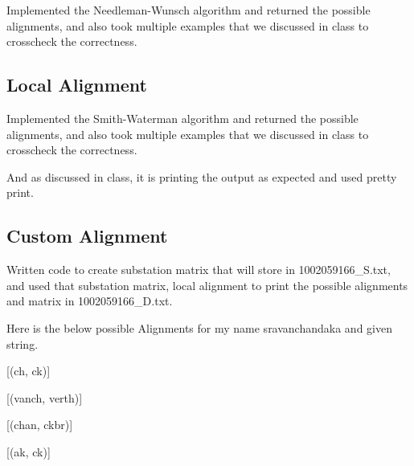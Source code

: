 \documentclass[
]{article}
\begin{document}
Implemented the Needleman-Wunsch algorithm and returned the possible
alignments, and also took multiple examples that we discussed in class
to crosscheck the correctness.

\hypertarget{local-alignment}{%
\subsection{\texorpdfstring{\textbf{Local
Alignment}}{Local Alignment}}\label{local-alignment}}

Implemented the Smith-Waterman algorithm and returned the possible
alignments, and also took multiple examples that we discussed in class
to crosscheck the correctness.

And as discussed in class, it is printing the output as expected and
used pretty print.

\hypertarget{section-1}{%
\subsection{}\label{section-1}}

\hypertarget{custom-alignment}{%
\subsection{\texorpdfstring{\textbf{Custom
Alignment}}{Custom Alignment}}\label{custom-alignment}}

Written code to create substation matrix that will store in
1002059166\_S.txt, and used that substation matrix, local alignment to
print the possible alignments and matrix in 1002059166\_D.txt.

Here is the below possible Alignments for my name sravanchandaka and
given string.

{[}(\textquotesingle ch\textquotesingle,
\textquotesingle ck\textquotesingle){]}

{[}(\textquotesingle vanch\textquotesingle,
\textquotesingle verth\textquotesingle){]}

{[}(\textquotesingle chan\textquotesingle,
\textquotesingle ckbr\textquotesingle){]}

{[}(\textquotesingle ak\textquotesingle,
\textquotesingle ck\textquotesingle){]}

\hypertarget{section-2}{%
\subsection{}\label{section-2}}

\hypertarget{section-3}{%
\subsection{}\label{section-3}}
\end{document}
